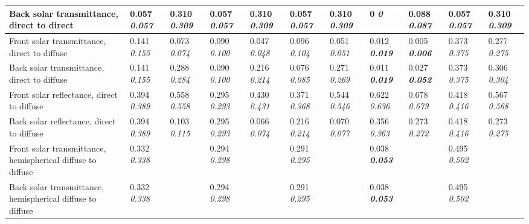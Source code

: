 \begin{longtable}[c]{p{1.0in}p{0.4in}p{0.4in}p{0.4in}p{0.4in}p{0.4in}p{0.4in}p{0.4in}p{0.4in}p{0.4in}p{0.4in}}
Back solar transmittance, direct to direct & 0.057 \quad \quad \textit{0.057} & 0.310 \quad \quad \textit{0.309} & 0.057 \quad \quad \textit{0.057} & 0.310 \quad \quad \textit{0.309} & 0.057 \quad \quad \textit{0.057} & 0.310 \quad \quad \textit{0.309} & 0 \quad \quad \textit{0} & 0.088 \quad \quad \textit{0.087} & 0.057 \quad \quad \textit{0.057} & 0.310 \quad \quad \textit{0.309} \tabularnewline \midrule
Front solar transmittance, direct to diffuse & 0.141 \quad \quad \textit{0.155} & 0.073 \quad \quad \textit{0.074} & 0.090 \quad \quad \textit{0.100} & 0.047 \quad \quad \textit{0.048} & 0.096 \quad \quad \textit{0.104} & 0.051 \quad \quad \textit{0.051} & 0.012 \quad \quad \textbf{\textit{0.019}} & 0.005 \quad \quad \textbf{\textit{0.006}} & 0.373 \quad \quad \textit{0.375} & 0.277 \quad \quad \textit{0.275} \tabularnewline \midrule
Back solar transmittance, direct to diffuse & 0.141 \quad \quad \textit{0.155} & 0.288 \quad \quad \textit{0.284} & 0.090 \quad \quad \textit{0.100} & 0.216 \quad \quad \textit{0.214} & 0.076 \quad \quad \textit{0.085} & 0.271 \quad \quad \textit{0.269} & 0.011 \quad \quad \textbf{\textit{0.019}} & 0.027 \quad \quad \textbf{\textit{0.052}} & 0.373 \quad \quad \textit{0.375} & 0.306 \quad \quad \textit{0.304} \tabularnewline \midrule
Front solar reflectance, direct to diffuse & 0.394 \quad \quad \textit{0.389} & 0.558 \quad \quad \textit{0.558} & 0.295 \quad \quad \textit{0.293} & 0.430 \quad \quad \textit{0.431} & 0.371 \quad \quad \textit{0.368} & 0.544 \quad \quad \textit{0.546} & 0.622 \quad \quad \textit{0.636} & 0.678 \quad \quad \textit{0.679} & 0.418 \quad \quad \textit{0.416} & 0.567 \quad \quad \textit{0.568} \tabularnewline \midrule
Back solar reflectance, direct to diffuse & 0.394 \quad \quad \textit{0.389} & 0.103 \quad \quad \textit{0.115} & 0.295 \quad \quad \textit{0.293} & 0.066 \quad \quad \textit{0.074} & 0.216 \quad \quad \textit{0.214} & 0.070 \quad \quad \textit{0.077} & 0.356 \quad \quad \textit{0.363} & 0.273 \quad \quad \textit{0.272} & 0.418 \quad \quad \textit{0.416} & 0.273 \quad \quad \textit{0.275} \tabularnewline \midrule
Front solar transmittance, hemispherical diffuse to diffuse & 0.332 \quad \quad \textit{0.338} &  & 0.294 \quad \quad \textit{0.298} &  & 0.291 \quad \quad \textit{0.295} &  & 0.038 \quad \quad \textbf{\textit{0.053}} &  & 0.495 \quad \quad \textit{0.502} \tabularnewline \midrule
Back solar transmittance, hemispherical diffuse to diffuse & 0.332 \quad \quad \textit{0.338} &  & 0.294 \quad \quad \textit{0.298} &  & 0.291 \quad \quad \textit{0.295} &  & 0.038 \quad \quad \textbf{\textit{0.053}} &  & 0.495 \quad \quad \textit{0.502} &  \tabularnewline \midrule

\end{longtable}
